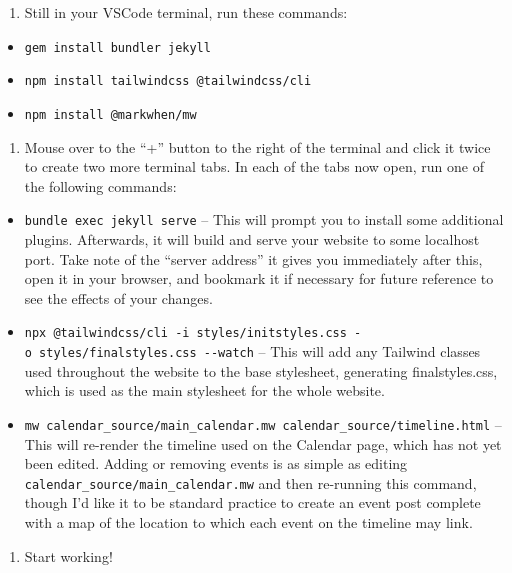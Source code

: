 \documentclass[
]{book}
\providecommand{\tightlist}{%
  \setlength{\itemsep}{0pt}\setlength{\parskip}{0pt}}
\begin{document}
\begin{enumerate}
\def\labelenumi{\arabic{enumi}.}
\setcounter{enumi}{6}
\tightlist
\item
  Still in your VSCode terminal, run these commands:
\end{enumerate}

\begin{itemize}
\tightlist
\item
  \texttt{gem\ install\ bundler\ jekyll}
\item
  \texttt{npm\ install\ tailwindcss\ @tailwindcss/cli}
\item
  \texttt{npm\ install\ @markwhen/mw}
\end{itemize}

\begin{enumerate}
\def\labelenumi{\arabic{enumi}.}
\setcounter{enumi}{7}
\tightlist
\item
  Mouse over to the ``+'' button to the right of the terminal and click it twice to create two more terminal tabs. In each of the tabs now open, run one of the following commands:
\end{enumerate}

\begin{itemize}
\tightlist
\item
  \texttt{bundle\ exec\ jekyll\ serve} -- This will prompt you to install some additional plugins. Afterwards, it will build and serve your website to some localhost port. Take note of the ``server address'' it gives you immediately after this, open it in your browser, and bookmark it if necessary for future reference to see the effects of your changes.
\item
  \texttt{npx\ @tailwindcss/cli\ -i\ styles/initstyles.css\ -o\ styles/finalstyles.css\ -\/-watch} -- This will add any Tailwind classes used throughout the website to the base stylesheet, generating finalstyles.css, which is used as the main stylesheet for the whole website.
\item
  \texttt{mw\ calendar\_source/main\_calendar.mw\ calendar\_source/timeline.html} -- This will re-render the timeline used on the Calendar page, which has not yet been edited. Adding or removing events is as simple as editing \texttt{calendar\_source/main\_calendar.mw} and then re-running this command, though I'd like it to be standard practice to create an event post complete with a map of the location to which each event on the timeline may link.
\end{itemize}

\begin{enumerate}
\def\labelenumi{\arabic{enumi}.}
\setcounter{enumi}{8}
\tightlist
\item
  Start working!
\end{enumerate}


\end{document}
